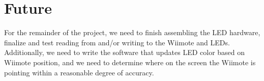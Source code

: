 \documentclass{tufte-handout}
\begin{document}
\section{Future}

For the remainder of the project, we need to finish assembling the LED
hardware, finalize and test reading from and/or writing to the Wiimote and
LEDs. Additionally, we need to write the software that updates LED color based
on Wiimote position, and we need to determine where on the screen the Wiimote
is pointing within a reasonable degree of accuracy.
\end{document}

